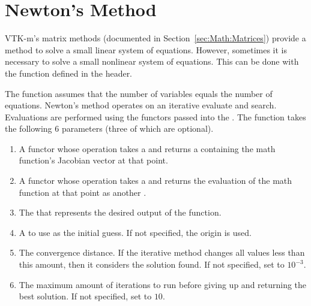 
\section{Newton's Method}


VTK-m's matrix methods (documented in Section~\ref{sec:Math:Matrices})
provide a method to solve a small linear system of equations. However,
sometimes it is necessary to solve a small nonlinear system of equations.
This can be done with the  function defined in the
 header.

The  function assumes that the number of
variables equals the number of equations. Newton's method operates on an
iterative evaluate and search. Evaluations are performed using the functors
passed into the . The function takes the
following 6 parameters (three of which are optional).

\begin{enumerate}
\item A functor whose operation takes a  and returns a
   containing the math function's Jacobian vector at that
  point.
\item A functor whose operation takes a  and returns the
  evaluation of the math function at that point as another .
\item The  that represents the desired output of the function.
\item A  to use as the initial guess. If not specified, the
  origin is used.
\item The convergence distance. If the iterative method changes all
  values less than this amount, then it considers the solution found. If
  not specified, set to $10^{-3}$.
\item The maximum amount of iterations to run before giving up and
  returning the best solution. If not specified, set to $10$.
\end{enumerate}



